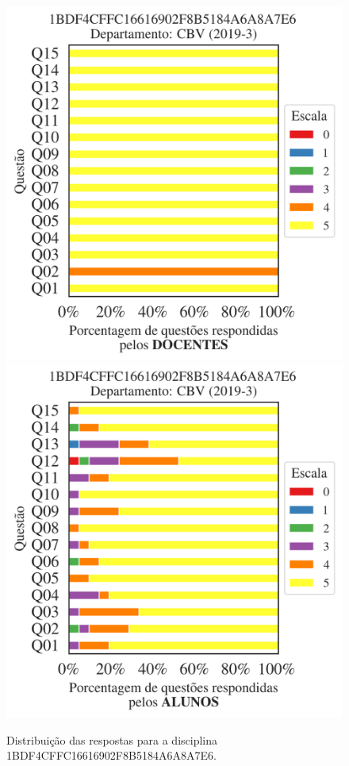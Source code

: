 \documentclass[a4paper,10pt]{article}
\begin{document}
\begin{figure}[h]
\centering
\includegraphics[width=0.485\linewidth]{analise_disciplina_departamento_CBV_1BDF4CFFC16616902F8B5184A6A8A7E6_docentes.png}
\includegraphics[width=0.485\linewidth]{analise_disciplina_departamento_CBV_1BDF4CFFC16616902F8B5184A6A8A7E6_alunos.png}
\caption{\label{fig:analise_geral_departamento}                Distribuição das respostas para a disciplina 1BDF4CFFC16616902F8B5184A6A8A7E6. }
\end{figure}
\end{document}
